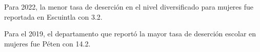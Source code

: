 Para 2022, la menor tasa de deserción en el nivel diversificado para mujeres fue reportada en Escuintla con 3.2. 

Para el 2019, el departamento que reportó la mayor tasa de deserción escolar en mujeres fue Péten con 14.2.  

